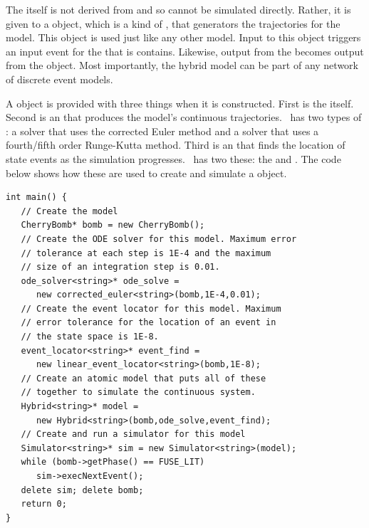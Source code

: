 The  itself is not derived from  and so cannot be simulated directly. Rather, it is given to a  object, which is a kind of , that generators the trajectories for the model. This  object is used just like any other  model. Input to this  object triggers an input event for the  that is contains. Likewise, output from the  becomes output from the  object. Most importantly, the hybrid model can be part of any network of discrete event models.

A  object is provided with three things when it is constructed. First is the  itself. Second is an  that produces the model's continuous trajectories. \adevs\ has two types of : a  solver that uses the corrected Euler method and a  solver that uses a fourth/fifth order Runge-Kutta method. Third is an  that finds the location of state events as the simulation progresses. \adevs\ has two these: the  and . The code below shows how these are used to create and simulate a  object.
\begin{verbatim}
int main() {
   // Create the model
   CherryBomb* bomb = new CherryBomb();
   // Create the ODE solver for this model. Maximum error
   // tolerance at each step is 1E-4 and the maximum
   // size of an integration step is 0.01.
   ode_solver<string>* ode_solve =
      new corrected_euler<string>(bomb,1E-4,0.01);
   // Create the event locator for this model. Maximum
   // error tolerance for the location of an event in
   // the state space is 1E-8.
   event_locator<string>* event_find =
      new linear_event_locator<string>(bomb,1E-8);
   // Create an atomic model that puts all of these
   // together to simulate the continuous system.
   Hybrid<string>* model =
      new Hybrid<string>(bomb,ode_solve,event_find);
   // Create and run a simulator for this model
   Simulator<string>* sim = new Simulator<string>(model);
   while (bomb->getPhase() == FUSE_LIT)
      sim->execNextEvent();
   delete sim; delete bomb;
   return 0;
}
\end{verbatim}

